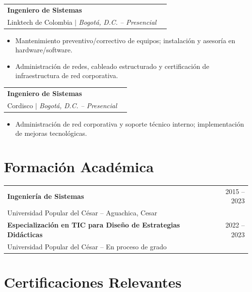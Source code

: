 \documentclass[10pt, letterpaper]{article}
\makeatletter
\newcommand{\cventry}[5]{%
  \noindent
  \begin{tabularx}{\linewidth}{@{}X r@{}}
    {\bfseries\color{primary} #1} & \cellcolor{accentlight}{\small\color{accent}\bfseries #2} \\
    {\small\color{accent} #3} \textcolor{medgray}{$|$} {\small\color{darkgray}\itshape #4} & \\
  \end{tabularx}
  \vspace{2pt}
  #5
  \vspace{6pt}
}
\makeatother
\begin{document}
\cventry
  {Ingeniero de Sistemas}
  {Mar 2016 – Mar 2017}
  {Linktech de Colombia}
  {Bogotá, D.C. – Presencial}
  {
    \begin{itemize}
      \item Mantenimiento preventivo/correctivo de equipos; instalación y asesoría en hardware/software.
      \item Administración de redes, cableado estructurado y certificación de infraestructura de red corporativa.
    \end{itemize}
  }

\cventry
  {Ingeniero de Sistemas}
  {Ene 2017 – Dic 2017}
  {Cordisco}
  {Bogotá, D.C. – Presencial}
  {
    \begin{itemize}
      \item Administración de red corporativa y soporte técnico interno; implementación de mejoras tecnológicas.
    \end{itemize}
  }

\section{Formación Académica}

\noindent
\begin{tabularx}{\linewidth}{@{}X r@{}}
  {\bfseries\color{primary} Ingeniería de Sistemas} & {\small\color{medgray} 2015 – 2023} \\
  {\small\color{darkgray} Universidad Popular del César – Aguachica, Cesar} & \\[6pt]
  {\bfseries\color{primary} Especialización en TIC para Diseño de Estrategias Didácticas} & {\small\color{medgray} 2022 – 2023} \\
  {\small\color{darkgray} Universidad Popular del César – En proceso de grado} & \\
\end{tabularx}

\section{Certificaciones Relevantes}
\end{document}
